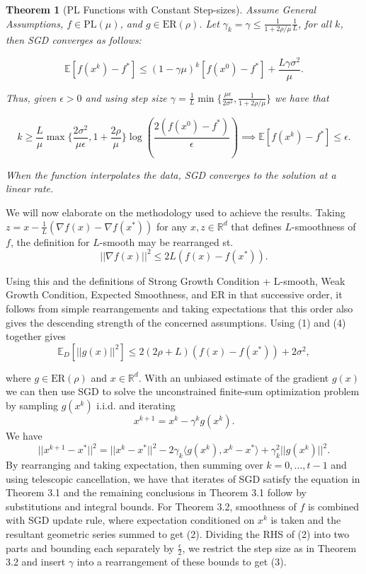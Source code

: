 \documentclass{article}
\newtheorem{theorem}{Theorem}[section]
\begin{document}
\begin{theorem}[PL Functions with Constant Step-sizes]
	Assume \textit{General Assumptions}, $f\in\text{PL}(\mu)$, and $g\in\text{ER}(\rho)$. Let $\gamma_k = \gamma\leq \frac{1}{1+2\rho/\mu}\frac{1}{L}$, for all $k$, then SGD converges as follows:

	\begin{equation}
		\mathbb{E}[f(x^k) - f^*] \leq (1-\gamma\mu)^k[f(x^0) - f^*] + \frac{L\gamma\sigma^2}{\mu}.
	\end{equation}

	Thus, given $\epsilon > 0$ and using step size $\gamma = \frac{1}{L}\min\{\frac{\mu\epsilon}{2\sigma^2}, \frac{1}{1+2\rho/\mu}\}$ we have that

	\begin{equation}
		k\geq \frac{L}{\mu}\max\{\frac{2\sigma^2}{\mu\epsilon}, 1+\frac{2\rho}{\mu}\}\log\left(\frac{2(f(x^0) - f^*)}{\epsilon}\right) \implies \mathbb{E}[f(x^k) - f^*]\leq \epsilon.
	\end{equation}

	When the function interpolates the data, SGD converges to the solution at a linear rate.
\end{theorem}

We will now elaborate on the methodology used to achieve the results. Taking $z=x-\frac{1}{L}(\nabla f(x) - \nabla f(x^*))$ for any $x,z\in\mathbb{R}^d$ that defines $L$-smoothness of $f$, the definition for $L$-smooth may be rearranged st.
\begin{equation}
	||\nabla f(x)||^2 \leq 2L(f(x) - f(x^*)).
\end{equation}

Using this and the definitions of Strong Growth Condition + L-smooth, Weak Growth Condition, Expected Smoothness, and ER in that successive order, it follows from simple rearrangements and taking expectations that this order also gives the descending strength of the concerned assumptions.
Using (1) and (4) together gives
\begin{equation}
	\mathbb{E}_D\left[||g(x)||^2\right]\leq 2(2\rho + L)(f(x) - f(x^*)) + 2\sigma^2,
\end{equation}

where $g\in\text{ER}(\rho)$ and $x\in\mathbb{R}^d$. With an unbiased estimate of the gradient $g(x)$ we can then use SGD to solve the unconstrained finite-sum optimization problem by sampling $g(x^k)$ i.i.d. and iterating
\[
	x^{k+1} = x^k - \gamma^k g(x^k).
\]
We have
\[
	||x^{k+1} - x^*||^2 = ||x^k - x^*||^2 - 2\gamma_k \langle g(x^k), x^k - x^*\rangle + \gamma_k^2 ||g(x^k)||^2.
\]
By rearranging and taking expectation, then summing over $k=0, \dots, t-1$ and using telescopic cancellation, we have that iterates of SGD satisfy the equation in Theorem 3.1 and the remaining conclusions in Theorem 3.1 follow by substitutions and integral bounds.
For Theorem 3.2, smoothness of $f$ is combined with SGD update rule, where expectation conditioned on $x^k$ is taken and the resultant geometric series summed to get (2). Dividing the RHS of (2) into two parts and bounding each separately by $\frac{\epsilon}{2}$, we restrict
the step size as in Theorem 3.2 and insert $\gamma$ into a rearrangement of these bounds to get (3).
\end{document}
